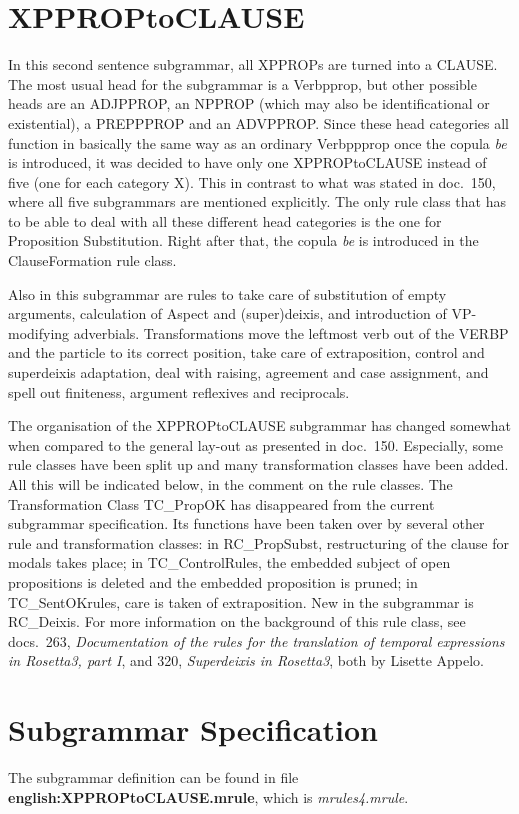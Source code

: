 \section{XPPROPtoCLAUSE}
In this second sentence subgrammar, all XPPROPs are turned into a CLAUSE. The 
most usual head for the subgrammar is a Verbpprop, but other possible heads are 
an ADJPPROP, an NPPROP (which may also be identificational or existential), a 
PREPPPROP and 
an ADVPPROP. Since these head categories all function in basically the same way 
as an 
ordinary Verbppprop once the copula {\em be\/} is introduced, it was decided to 
have only one XPPROPtoCLAUSE instead of five (one for each category X). This in 
contrast to what was stated in doc.\ 150, where all five subgrammars are 
mentioned explicitly. The only rule class that has to be able to deal with all 
these different head categories is the one for Proposition Substitution. Right 
after that, the copula {\em be\/} is introduced in the ClauseFormation rule 
class.

Also in this subgrammar are rules to take care of substitution of empty 
arguments, calculation of Aspect and (super)deixis, and introduction of 
VP-modifying adverbials. Transformations  move the leftmost verb 
out of the VERBP and the particle to its correct position, take care of 
extraposition, control and superdeixis 
adaptation, deal with raising, agreement and case assignment, and spell out 
finiteness, argument reflexives and reciprocals.

The organisation of the XPPROPtoCLAUSE subgrammar has changed somewhat when 
compared to the general lay-out as presented in doc.\ 150. Especially,
some rule classes have been split up and many transformation classes have been 
added. All this will be 
indicated below, in the comment on the rule classes. The Transformation Class 
TC\_PropOK has disappeared from the current subgrammar specification. Its 
functions have been taken over by several other rule and transformation 
classes: in RC\_PropSubst, restructuring of the clause for modals takes place; 
in TC\_ControlRules, the embedded subject of open propositions is deleted and 
the embedded proposition is pruned; in TC\_SentOKrules, care is taken of 
extraposition. New in the subgrammar is RC\_Deixis. For more information on the 
background of this rule class, see docs.\ 263, {\em Documentation of the rules 
for the translation of temporal expressions in Rosetta3, part I\/}, and 320, {
\em Superdeixis in Rosetta3\/}, both by Lisette Appelo.

\newpage
\section{Subgrammar Specification}
The subgrammar definition can be found in file {\bf 
english:XPPROPtoCLAUSE.mrule}, which is {\em mrules4.mrule\/}.

